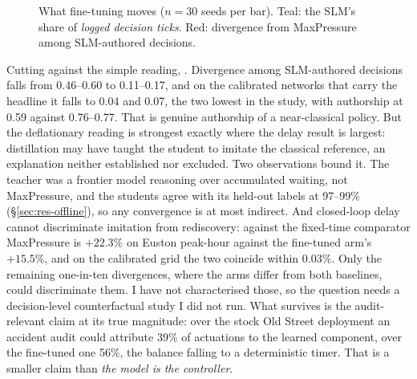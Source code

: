 \begin{figure}[t]
\centering
{}
\caption{What fine-tuning moves ($n{=}30$ seeds per bar). Teal: the SLM's
share of \emph{logged decision ticks}. Red: divergence from MaxPressure
among SLM-authored decisions.}
\label{fig:authorship}
\end{figure}

Cutting against the simple reading, .
Divergence among SLM-authored decisions falls from 0.46--0.60 to
0.11--0.17, and on the calibrated networks that carry the headline it
falls to 0.04 and 0.07, the two lowest in the study, with authorship at
0.59 against 0.76--0.77. That is genuine authorship of a near-classical
policy. But the deflationary reading is strongest exactly where the delay
result is largest: distillation may have taught the student to imitate the
classical reference, an explanation neither established nor excluded. Two
observations bound it. The teacher was a frontier model reasoning over
accumulated waiting, not MaxPressure, and the students agree with its
held-out labels at 97--99\% (\S\ref{sec:res-offline}), so any convergence
is at most indirect. And closed-loop delay cannot discriminate imitation
from rediscovery: against the fixed-time comparator MaxPressure is
$+22.3\%$ on Euston peak-hour against the fine-tuned arm's $+15.5\%$, and
on the calibrated grid the two coincide within $0.03\%$. Only the
remaining one-in-ten divergences, where the arms differ from both
baselines, could discriminate them. I have not characterised those, so the
question needs a decision-level counterfactual study I did not run. What
survives is the audit-relevant claim at its true magnitude: over the stock
Old Street deployment an accident audit could attribute 39\% of actuations
to the learned component, over the fine-tuned one 56\%, the balance
falling to a deterministic timer. That is a smaller claim than \emph{the
model is the controller}.
